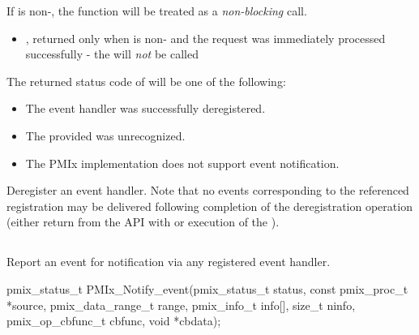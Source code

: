 If  is non-, the function will be treated as a \emph{non-blocking} call.

\returnsimplenb

\begin{itemize}
\item {}, returned only when  is non- and the request was immediately processed successfully - the  will \textit{not} be called
\end{itemize}

The returned status code of  will be one of the following:

\begin{itemize}
\item {} The event handler was successfully deregistered.
\item {} The provided  was unrecognized.
\item {} The \ac{PMIx} implementation does not support event notification.
\end{itemize}

\descr

Deregister an event handler. Note that no events corresponding to the referenced registration may be delivered following completion of the deregistration operation (either return from the \ac{API} with  or execution of the ).

\subsection{}

\summary

Report an event for notification via any
registered event handler.

\format

\cspecificstart
\begin{codepar}
pmix_status_t
PMIx_Notify_event(pmix_status_t status,
                  const pmix_proc_t *source,
                  pmix_data_range_t range,
                  pmix_info_t info[], size_t ninfo,
                  pmix_op_cbfunc_t cbfunc, void *cbdata);
\end{codepar}
\cspecificend

